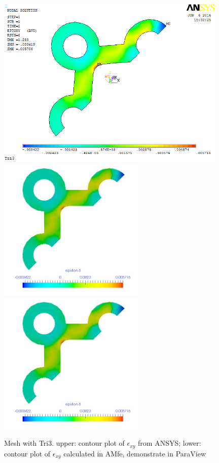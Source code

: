 \begin{figure}[htbp]
	\begin{center}
		\includegraphics[width=11cm,clip]{TTri3_Exy.png} 
		\includegraphics[width=7cm,clip]{TTri3_Exy_PD.png} 		
		\includegraphics[width=7cm,clip]{TTri3_Exy_P.png} 		
		\caption{Mesh with Tri3. upper: contour plot of $\epsilon_{xy}$ from ANSYS; lower: contour plot of $\epsilon_{xy}$ calculated in AMfe, demonstrate in ParaView} \label{fig: Tri3_Exy}
	\end{center}
\end{figure}
\clearpage 


